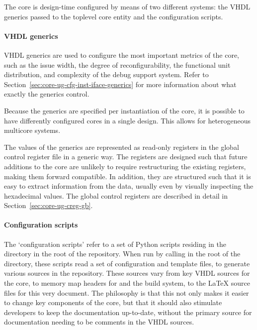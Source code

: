 
\label{sec:core-ug-cfg}

The \rvex{} core is design-time configured by means of two different systems:
the VHDL generics passed to the toplevel core entity and the configuration
scripts.

\paragraph*{VHDL generics} VHDL generics are used to configure the most 
important metrics of the core, such as the issue width, the degree of 
reconfigurability, the functional unit distribution, and complexity of the debug 
support system. Refer to Section~\ref{sec:core-ug-cfg-inst-iface-generics} for 
more information about what exactly the generics control.

Because the generics are specified per instantiation of the core, it is possible
to have differently configured \rvex{} cores in a single design. This allows for
heterogeneous multicore systems.

The values of the generics are represented as read-only registers in the global
control register file in a generic way. The registers are designed such that
future additions to the core are unlikely to require restructuring the existing
registers, making them forward compatible. In addition, they are structured such
that it is easy to extract information from the data, usually even by visually
inspecting the hexadecimal values. The global control registers are described in
detail in Section~\ref{sec:core-ug-creg-gb}.


\paragraph*{Configuration scripts} The `configuration scripts' refer to a set of 
Python scripts residing in the  directory in the root of the 
\rvex{} repository. When run by calling  in the root of the 
 directory, these scripts read a set of configuration and template 
files, to generate various sources in the repository. These sources vary from 
key VHDL sources for the \rvex{} core, to memory map headers for  and 
the build system, to the LaTeX source files for this very document. The 
philosophy is that this not only makes it easier to change key components of the 
core, but that it should also stimulate developers to keep the documentation 
up-to-date, without the primary source for documentation needing to be comments 
in the VHDL sources.

